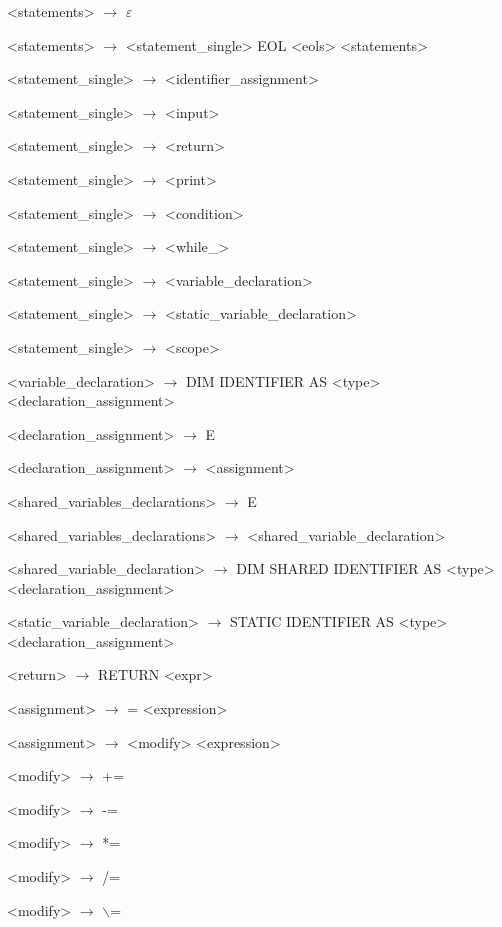 \begin{normalsize}
\begin{enumerate}
{        \item <statements> $\rightarrow$ $\varepsilon$
        \item <statements> $\rightarrow$ <statement\_single> EOL <eols> <statements>


        \item <statement\_single> $\rightarrow$ <identifier\_assignment>
        \item <statement\_single> $\rightarrow$ <input>
        \item <statement\_single> $\rightarrow$ <return>
        \item <statement\_single> $\rightarrow$ <print>
        \item <statement\_single> $\rightarrow$ <condition>
        \item <statement\_single> $\rightarrow$ <while\_>
        \item <statement\_single> $\rightarrow$ <variable\_declaration>
        \item <statement\_single> $\rightarrow$ <static\_variable\_declaration>
        \item <statement\_single> $\rightarrow$ <scope>

        \item <variable\_declaration> $\rightarrow$ DIM IDENTIFIER AS <type> <declaration\_assignment>
        \item <declaration\_assignment> $\rightarrow$ E
        \item <declaration\_assignment> $\rightarrow$ <assignment>

        \item <shared\_variables\_declarations> $\rightarrow$ E
        \item <shared\_variables\_declarations> $\rightarrow$ <shared\_variable\_declaration>
        \item <shared\_variable\_declaration> $\rightarrow$ DIM SHARED IDENTIFIER AS <type> <declaration\_assignment>

        \item <static\_variable\_declaration> $\rightarrow$ STATIC IDENTIFIER AS <type> <declaration\_assignment>

        \item <return> $\rightarrow$ RETURN <expr>

        \item <assignment> $\rightarrow$ = <expression>
        \item <assignment> $\rightarrow$ <modify> <expression>
        \item <modify> $\rightarrow$ +=
        \item <modify> $\rightarrow$ -=
        \item <modify> $\rightarrow$ *=
        \item <modify> $\rightarrow$ /=
        \item <modify> $\rightarrow$ $\backslash$=

}
\end{enumerate}
\end{normalsize}
